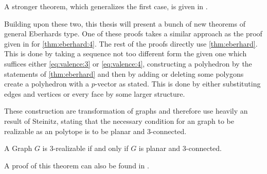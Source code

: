 A stronger theorem, which generalizes the first case, is given in \cite{jendrol1977generalization}.

Building upon these two, this thesis will present a bunch of new theorems of general Eberhards type. One of these proofs takes a similar approach as the proof given in \cite{ConvexPolytopes} for \autoref{thm:eberhard:4}. The rest of the proofs directly use \autoref{thm:eberhard}. This is done by taking a sequence not too different form the given one which suffices either \autoref{eq:valence:3} or \autoref{eq:valence:4}, constructing a polyhedron by the statements of \autoref{thm:eberhard} and then by adding or deleting some polygons create a polyhedron with a $p$-vector as stated. This is done by either substituting edges and vertices or every face by some larger structure. 

These construction are transformation of graphs and therefore use heavily an result of Steinitz, stating that the necessary condition for an graph to be realizable as an polytope is to be planar and $3$-connected.

\begin{theorem}\label{thm:steinitz}
  A Graph $G$ is $3$-realizable if and only if $G$ is planar and $3$-connected.
\end{theorem}
A proof of this theorem can also be found in \cite{ConvexPolytopes}.
